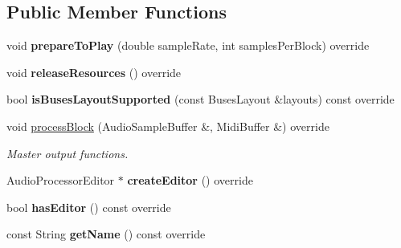 \subsection*{Public Member Functions}
\begin{DoxyCompactItemize}
\item 
void {\bfseries prepare\+To\+Play} (double sample\+Rate, int samples\+Per\+Block) override\hypertarget{class_synth_audio_processor_a91b19a3f6194e32354b21bb6d941737b}{}\label{class_synth_audio_processor_a91b19a3f6194e32354b21bb6d941737b}

\item 
void {\bfseries release\+Resources} () override\hypertarget{class_synth_audio_processor_a638f29a06a7023608e0232eadd8a1cba}{}\label{class_synth_audio_processor_a638f29a06a7023608e0232eadd8a1cba}

\item 
bool {\bfseries is\+Buses\+Layout\+Supported} (const Buses\+Layout \&layouts) const  override\hypertarget{class_synth_audio_processor_a9b59a3d160ea46c3696e342bbf09daf9}{}\label{class_synth_audio_processor_a9b59a3d160ea46c3696e342bbf09daf9}

\item 
void \hyperlink{class_synth_audio_processor_a06aca846ee4bc24cb94dd27b580038fa}{process\+Block} (Audio\+Sample\+Buffer \&, Midi\+Buffer \&) override\hypertarget{class_synth_audio_processor_a06aca846ee4bc24cb94dd27b580038fa}{}\label{class_synth_audio_processor_a06aca846ee4bc24cb94dd27b580038fa}

\begin{DoxyCompactList}\small\item\em Master output functions. \end{DoxyCompactList}\item 
Audio\+Processor\+Editor $\ast$ {\bfseries create\+Editor} () override\hypertarget{class_synth_audio_processor_a1b0368ea8ee1c71a592341fe41b2a6d2}{}\label{class_synth_audio_processor_a1b0368ea8ee1c71a592341fe41b2a6d2}

\item 
bool {\bfseries has\+Editor} () const  override\hypertarget{class_synth_audio_processor_ae5734bece34856315204ddd0a81367dd}{}\label{class_synth_audio_processor_ae5734bece34856315204ddd0a81367dd}

\item 
const String {\bfseries get\+Name} () const  override\hypertarget{class_synth_audio_processor_a40ce571a9c48ae0cf3cfa1e3305a4bc3}{}\label{class_synth_audio_processor_a40ce571a9c48ae0cf3cfa1e3305a4bc3}


\end{DoxyCompactItemize}
